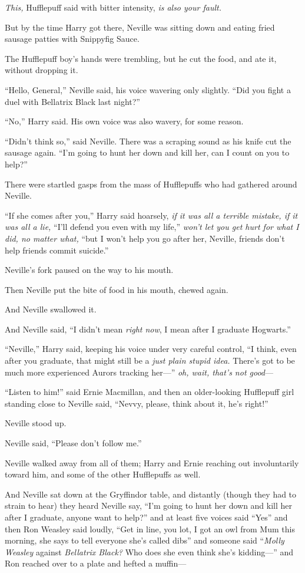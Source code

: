\emph{This,} Hufflepuff said with bitter intensity, \emph{is also your fault.}

But by the time Harry got there, Neville was sitting down and eating fried sausage patties with Snippyfig Sauce.

The Hufflepuff boy’s hands were trembling, but he cut the food, and ate it, without dropping it.

“Hello, General,” Neville said, his voice wavering only slightly. “Did you fight a duel with Bellatrix Black last night?”

“No,” Harry said. His own voice was also wavery, for some reason.

“Didn’t think so,” said Neville. There was a scraping sound as his knife cut the sausage again. “I’m going to hunt her down and kill her, can I count on you to help?”

There were startled gasps from the mass of Hufflepuffs who had gathered around Neville.

“If she comes after you,” Harry said hoarsely, \emph{if it was all a terrible mistake, if it was all a lie,} “I’ll defend you even with my life,” \emph{won’t let you get hurt for what I did, no matter what,} “but I won’t help you go after her, Neville, friends don’t help friends commit suicide.”

Neville’s fork paused on the way to his mouth.

Then Neville put the bite of food in his mouth, chewed again.

And Neville swallowed it.

And Neville said, “I didn’t mean \emph{right now}, I mean after I graduate Hogwarts.”

“Neville,” Harry said, keeping his voice under very careful control, “I think, even after you graduate, that might still be a \emph{just plain stupid idea.} There’s got to be much more experienced Aurors tracking her—” \emph{oh, wait, that’s not good}—

“Listen to him!” said Ernie Macmillan, and then an older-looking Hufflepuff girl standing close to Neville said, “Nevvy, please, think about it, he’s right!”

Neville stood up.

Neville said, “Please don’t follow me.”

Neville walked away from all of them; Harry and Ernie reaching out involuntarily toward him, and some of the other Hufflepuffs as well.

And Neville sat down at the Gryffindor table, and distantly (though they had to strain to hear) they heard Neville say, “I’m going to hunt her down and kill her after I graduate, anyone want to help?” and at least five voices said “Yes” and then Ron Weasley said loudly, “Get in line, you lot, I got an owl from Mum this morning, she says to tell everyone she’s called dibs” and someone said “\emph{Molly Weasley} against \emph{Bellatrix Black?} Who does she even think she’s kidding—” and Ron reached over to a plate and hefted a muffin—

